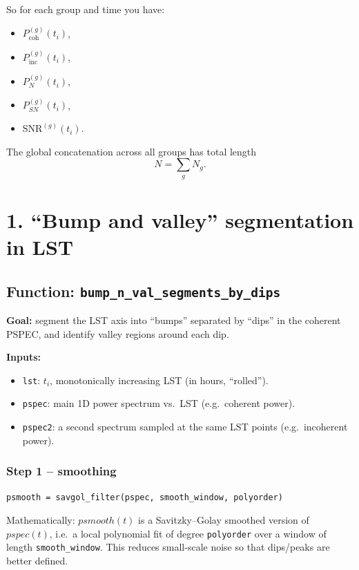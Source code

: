 \documentclass[11pt]{article}
\begin{document}
So for each group and time you have:

\begin{itemize}[leftmargin=*]
  \item $P_{\mathrm{coh}}^{(g)}(t_i)$,
  \item $P_{\mathrm{inc}}^{(g)}(t_i)$,
  \item $P_N^{(g)}(t_i)$,
  \item $P_{SN}^{(g)}(t_i)$,
  \item $\mathrm{SNR}^{(g)}(t_i)$.
\end{itemize}

The global concatenation across all groups has total length
\[
  N = \sum_g N_g.
\]

\section*{1. ``Bump and valley'' segmentation in LST}

\subsection*{Function: \texttt{bump\_n\_val\_segments\_by\_dips}}

\textbf{Goal:} segment the LST axis into ``bumps'' separated by ``dips'' in the coherent PSPEC, and identify valley regions around each dip.

\textbf{Inputs:}

\begin{itemize}[leftmargin=*]
  \item \texttt{lst}: $t_i$, monotonically increasing LST (in hours, ``rolled'').
  \item \texttt{pspec}: main 1D power spectrum vs.\ LST (e.g.\ coherent power).
  \item \texttt{pspec2}: a second spectrum sampled at the same LST points (e.g.\ incoherent power).
\end{itemize}

\subsubsection*{Step 1 -- smoothing}

\begin{verbatim}
psmooth = savgol_filter(pspec, smooth_window, polyorder)
\end{verbatim}

Mathematically: $psmooth(t)$ is a Savitzky--Golay smoothed version of $pspec(t)$, i.e.\ a local polynomial fit of degree \texttt{polyorder} over a window of length \texttt{smooth\_window}. This reduces small-scale noise so that dips/peaks are better defined.
\end{document}
